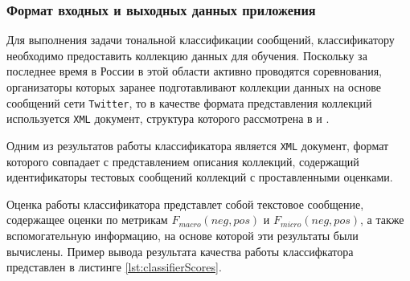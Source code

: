     \subsubsection{Формат входных и выходных данных приложения}
    Для выполнения задачи тональной классификации сообщений, классификатору
    необходимо предоставить коллекцию данных для обучения. Поскольку за последнее
    время в России в этой области активно проводятся соревнования, организаторы
    которых заранее подготавливают коллекции данных на основе сообщений сети
    {\tt Twitter}, то в качестве формата представления коллекций используется
    {\tt XML} документ, структура которого рассмотрена в \cite{dialog2015}
    и \cite{dialog2016}.


    Одним из результатов работы классификатора является {\tt XML}
    документ, формат которого совпадает с представлением описания коллекций,
    содержащий идентификаторы тестовых сообщений коллекций с проставленными оценками.


    Оценка работы классификатора представлет собой текстовое сообщение,
    содержащее оценки по метрикам  $F_{macro}(neg, pos)$ и $F_{micro}(neg, pos)$,
    а также вспомогательную информацию, на основе которой эти результаты были
    вычислены. Пример вывода результата качества работы классифкатора представлен
    в листинге \ref{lst:classifierScores}.
    \lstset{style=xml}
    

